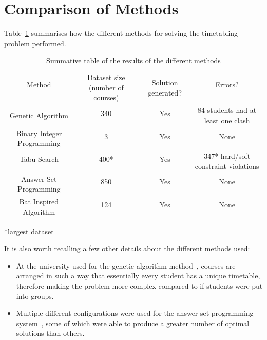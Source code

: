 \documentclass[a4paper, 12pt]{report}
\begin{document}
\newpage

\section{Comparison of Methods}

Table~\ref*{table:method-comparison} summarises how the different methods for 
solving the timetabling problem performed.

\begin{table}
	\begin{tabular}{cccc}
		\toprule
		Method 
			& \multirow{2}{9em}{Dataset size (number of courses)}
			& \multirow{2}{6em}{Solution generated?}
			& Errors? \\
		\\
		\midrule
		\multirow{2}{10em}{Genetic Algorithm\cite{ga_example}}
			& 340
			& Yes 
			& \multirow{2}{9em}{84 students had at least one clash} \\
		\\
		\multirow{2}{10em}{Binary Integer Programming\cite{bip_example}}
			& 3
			& Yes
			& None \\
		\\
		\multirow{1}{10em}{Tabu Search\cite{tabu_example}}
			& 400*
			& Yes 
			& \multirow{2}{9em}{347* hard/soft constraint violations} \\
		\\
		\multirow{2}{10em}{Answer Set Programming\cite{asp_example}}
			& 850
			& Yes 
			& None \\
		\\
		\multirow{2}{10em}{Bat Inspired Algorithm\cite{ba_example}}
			& 124
			& Yes
			& None \\
		\\
		\bottomrule
	\end{tabular}
	\caption{Summative table of the results of the different methods}
	\label{table:method-comparison}
\end{table}
*largest dataset

It is also worth recalling a few other details about the different methods used:
\begin{itemize}
	\item At the university used for the genetic algorithm 
		method~\cite{ga_example}, courses are arranged in such a way that 
		essentially every student has a unique timetable, therefore making the 
		problem more complex compared to if students were put into groups.
	\item Multiple different configurations were used for the answer set 
		programming system~\cite{asp_example}, some of which were able to 
		produce a greater number of optimal solutions than others.
\end{itemize}
\end{document}
